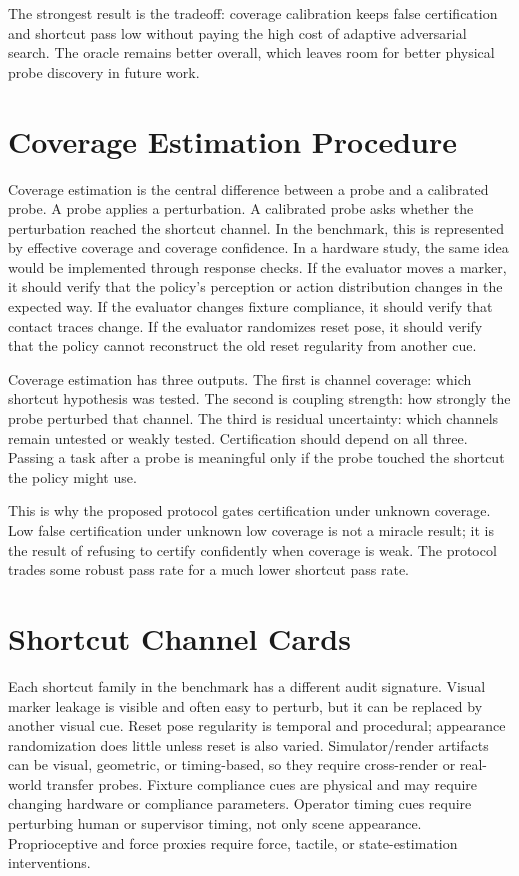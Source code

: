 \documentclass{article}
\begin{document}
The strongest result is the tradeoff: coverage calibration keeps false certification and shortcut pass low without paying the high cost of adaptive adversarial search. The oracle remains better overall, which leaves room for better physical probe discovery in future work.

\clearpage
\section{Coverage Estimation Procedure}

Coverage estimation is the central difference between a probe and a calibrated probe. A probe applies a perturbation. A calibrated probe asks whether the perturbation reached the shortcut channel. In the benchmark, this is represented by effective coverage and coverage confidence. In a hardware study, the same idea would be implemented through response checks. If the evaluator moves a marker, it should verify that the policy's perception or action distribution changes in the expected way. If the evaluator changes fixture compliance, it should verify that contact traces change. If the evaluator randomizes reset pose, it should verify that the policy cannot reconstruct the old reset regularity from another cue.

Coverage estimation has three outputs. The first is channel coverage: which shortcut hypothesis was tested. The second is coupling strength: how strongly the probe perturbed that channel. The third is residual uncertainty: which channels remain untested or weakly tested. Certification should depend on all three. Passing a task after a probe is meaningful only if the probe touched the shortcut the policy might use.

This is why the proposed protocol gates certification under unknown coverage. Low false certification under unknown low coverage is not a miracle result; it is the result of refusing to certify confidently when coverage is weak. The protocol trades some robust pass rate for a much lower shortcut pass rate.

\clearpage
\section{Shortcut Channel Cards}

Each shortcut family in the benchmark has a different audit signature. Visual marker leakage is visible and often easy to perturb, but it can be replaced by another visual cue. Reset pose regularity is temporal and procedural; appearance randomization does little unless reset is also varied. Simulator/render artifacts can be visual, geometric, or timing-based, so they require cross-render or real-world transfer probes. Fixture compliance cues are physical and may require changing hardware or compliance parameters. Operator timing cues require perturbing human or supervisor timing, not only scene appearance. Proprioceptive and force proxies require force, tactile, or state-estimation interventions.
\end{document}
